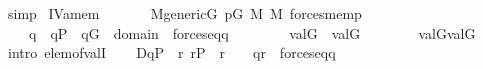 \begin{isabellebody}
\ simp\isanewline
{}\isamarkupfalse%
%
\endisatagproof
{\isafoldproof}%
%
\isadelimproof
\isanewline
%
\endisadelimproof
\isanewline
\isanewline
{}\isamarkupfalse%
\ IV{}{}{}a{\isacharunderscore}{\kern0pt}mem{\isacharcolon}{\kern0pt}\isanewline
\ \ \isanewline
\ \ \ \ {\isachardoublequoteopen}M{\isacharunderscore}{\kern0pt}generic{\isacharparenleft}{\kern0pt}G{\isacharparenright}{\kern0pt}{\isachardoublequoteclose}\ {\isachardoublequoteopen}p{\isasymin}G{\isachardoublequoteclose}\ {\isachardoublequoteopen}{\isasympi}{\isasymin}M{\isachardoublequoteclose}\ {\isachardoublequoteopen}{\isasymtau}{\isasymin}M{\isachardoublequoteclose}\ {\isachardoublequoteopen}forces{\isacharunderscore}{\kern0pt}mem{\isacharparenleft}{\kern0pt}p{\isacharcomma}{\kern0pt}{\isasympi}{\isacharcomma}{\kern0pt}{\isasymtau}{\isacharparenright}{\kern0pt}{\isachardoublequoteclose}\isanewline
\ \ \ \ {\isachardoublequoteopen}{\isasymAnd}q\ {\isasymsigma}{\isachardot}{\kern0pt}\ q{\isasymin}P\ {\isasymLongrightarrow}\ q{\isasymin}G\ {\isasymLongrightarrow}\ {\isasymsigma}{\isasymin}domain{\isacharparenleft}{\kern0pt}{\isasymtau}{\isacharparenright}{\kern0pt}\ {\isasymLongrightarrow}\ forces{\isacharunderscore}{\kern0pt}eq{\isacharparenleft}{\kern0pt}q{\isacharcomma}{\kern0pt}{\isasympi}{\isacharcomma}{\kern0pt}{\isasymsigma}{\isacharparenright}{\kern0pt}\ {\isasymLongrightarrow}\ \isanewline
\ \ \ \ \ \ val{\isacharparenleft}{\kern0pt}G{\isacharcomma}{\kern0pt}{\isasympi}{\isacharparenright}{\kern0pt}\ {\isacharequal}{\kern0pt}\ val{\isacharparenleft}{\kern0pt}G{\isacharcomma}{\kern0pt}{\isasymsigma}{\isacharparenright}{\kern0pt}{\isachardoublequoteclose}\ \isanewline
\ \ \isanewline
\ \ \ \ {\isachardoublequoteopen}val{\isacharparenleft}{\kern0pt}G{\isacharcomma}{\kern0pt}{\isasympi}{\isacharparenright}{\kern0pt}{\isasymin}val{\isacharparenleft}{\kern0pt}G{\isacharcomma}{\kern0pt}{\isasymtau}{\isacharparenright}{\kern0pt}{\isachardoublequoteclose}\isanewline
%
\isadelimproof
%
\endisadelimproof
%
\isatagproof
{}\isamarkupfalse%
\ {\isacharparenleft}{\kern0pt}intro\ elem{\isacharunderscore}{\kern0pt}of{\isacharunderscore}{\kern0pt}valI{\isacharparenright}{\kern0pt}\isanewline
\ \ \isamarkupfalse%
\ {\isacharquery}{\kern0pt}D{\isacharequal}{\kern0pt}{\isachardoublequoteopen}{\isacharbraceleft}{\kern0pt}q{\isasymin}P{\isachardot}{\kern0pt}\ {\isasymexists}{\isasymsigma}{\isachardot}{\kern0pt}\ {\isasymexists}r{\isachardot}{\kern0pt}\ r{\isasymin}P\ {\isasymand}\ {\isasymlangle}{\isasymsigma}{\isacharcomma}{\kern0pt}r{\isasymrangle}\ {\isasymin}\ {\isasymtau}\ {\isasymand}\ q{\isasympreceq}r\ {\isasymand}\ forces{\isacharunderscore}{\kern0pt}eq{\isacharparenleft}{\kern0pt}q{\isacharcomma}{\kern0pt}{\isasympi}{\isacharcomma}{\kern0pt}{\isasymsigma}{\isacharparenright}{\kern0pt}{\isacharbraceright}{\kern0pt}{\isachardoublequoteclose}\isanewline

\end{isabellebody}
